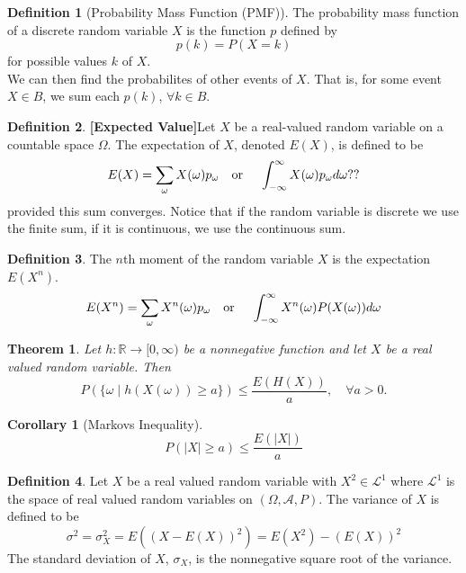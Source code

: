 \documentclass{article}
\newtheorem{theorem}{Theorem}[section]
\newtheorem{corollary}{Corollary}[section]
\theoremstyle{definition}
\newtheorem{definition}{Definition}[section]
\theoremstyle{remark}
\begin{document}
\begin{definition}[Probability Mass Function (PMF)]\label{def:pmf}
The probability mass function of a discrete random variable $X$ is the function
$p$ defined by 
\[
p(k) = P(X=k)
\]
for possible values $k$ of $X$.\\
We can then find the probabilites of other events of $X$. That is, for some event $X\in B$, we 
sum each $p(k)$, $\forall k \in B$. 
\end{definition}













\begin{definition}\textbf{[Expected Value]}\label{def:expected value}
Let $X$ be a real-valued random variable on a countable space $\Omega$. The expectation of $X$, denoted $E(X)$, is defined to be 
\[
E(X) = \sum_{\omega}{X(\omega)p_\omega} \quad \textnormal{or } \quad \int_{-\infty}^{\infty}X(\omega)p_\omega d\omega??
\]
provided this sum converges. Notice that if the random variable is discrete we use the finite sum, if it is continuous, we use the continuous sum.
\end{definition}

\begin{definition}
The $n$th moment of the random variable $X$ is the expectation $E(X^n)$. 
\[
E(X^n) = \sum_{\omega}{X^n(\omega)p_\omega} \quad \textnormal{or } \quad \int_{-\infty}^{\infty}X^n(\omega)P(X(\omega)) d\omega
\]
\end{definition}



\begin{theorem}
Let $h: \mathbb{R} \to [0,\infty)$ be a nonnegative function and let $X$ be a real valued random variable. Then 
\[
P(\{\omega \mid h(X(\omega)) \geq a\}) \leq \frac{E(H(X))}{a}, \quad \forall a > 0.
\]
\end{theorem}



\begin{corollary}[Markovs Inequality] \label{Markovs Inequality}
\[
P({|X| \geq a}) \leq \frac{E(|X|)}{a}
\]

\end{corollary}



\begin{definition}\label{def: Variance and Standard Deviation}
Let $X$ be a real valued random variable with $X^2 \in \mathcal{L}^1$ where $\mathcal{L}^1$ is the space of real valued random variables on $(\Omega, \mathcal{A}, P)$. The variance of $X$ is defined to be
\[
\sigma^2 = \sigma^2_X = E((X - E(X))^2) = E(X^2) - (E(X))^2
\]
The standard deviation of $X$, $\sigma_X$, is the nonnegative square root of the variance. 

\end{definition}
\end{document}
